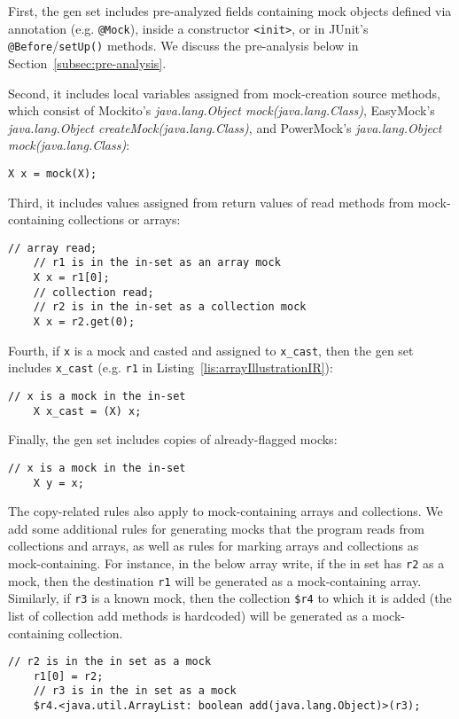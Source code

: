 First, the gen set includes pre-analyzed fields containing mock objects defined via annotation (e.g. \texttt{@Mock}), inside a constructor \texttt{<init>}, or in JUnit's \texttt{@Before}/\texttt{setUp()} methods. We discuss the pre-analysis below in Section~\ref{subsec:pre-analysis}. 

Second, it includes local variables assigned from mock-creation source methods, which consist of Mockito's \textit{java.lang.Object mock(java.lang.Class)}, EasyMock's \textit{java.lang.Object createMock(java.lang.Class)}, and PowerMock's \textit{java.lang.Object mock(java.lang.Class)}:
\begin{lstlisting}[basicstyle=\ttfamily\small,numbers=none]
	X x = mock(X);
\end{lstlisting}

Third, it includes values assigned from return values of read methods from mock-containing collections or arrays:
\begin{lstlisting}[basicstyle=\ttfamily\small,numbers=none]
	// array read;
	// r1 is in the in-set as an array mock
	X x = r1[0];
	// collection read;
	// r2 is in the in-set as a collection mock
	X x = r2.get(0);
\end{lstlisting}

Fourth, if \texttt{x} is a mock and casted and assigned to \texttt{x\_cast}, then the gen set includes \texttt{x\_cast} (e.g. \texttt{r1} in Listing~\ref{lis:arrayIllustrationIR}):
\begin{lstlisting}[basicstyle=\ttfamily\small,numbers=none]
	// x is a mock in the in-set
	X x_cast = (X) x;
\end{lstlisting}

Finally, the gen set includes copies of already-flagged mocks:
\begin{lstlisting}[basicstyle=\ttfamily\small,numbers=none]
	// x is a mock in the in-set
	X y = x;
\end{lstlisting}
The copy-related rules also apply to mock-containing arrays and collections. We add some additional rules for generating mocks that the program reads from collections and arrays, as well as rules for marking arrays and collections as mock-containing. For instance, in the below array write, if the in set has \texttt{r2} as a mock, then the destination \texttt{r1} will be generated as a mock-containing array. Similarly, if \texttt{r3} is a known mock, then the collection \texttt{\$r4} to which it is added (the list of collection add methods is hardcoded) will be generated as a mock-containing collection.
\begin{lstlisting}[basicstyle=\ttfamily\small,numbers=none]
	// r2 is in the in set as a mock
	r1[0] = r2;
	// r3 is in the in set as a mock
	$r4.<java.util.ArrayList: boolean add(java.lang.Object)>(r3);
\end{lstlisting}

